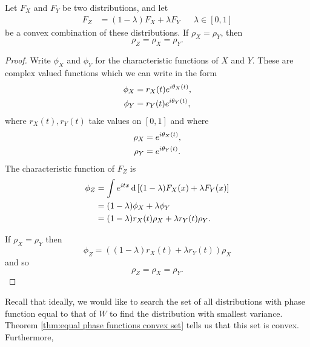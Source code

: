 	\begin{theorem}
	\label{thm:equal phase functions convex set}
		Let $F_X$ and $F_Y$ be two distributions, and let
		\begin{align}
			F_Z &= (1 - \lambda) F_X + \lambda F_Y && \lambda \in [0,1]
		\end{align}
		be a convex combination of these distributions. If $\rho_X = \rho_Y$, then 
		\begin{equation}
			\rho_Z = \rho_X = \rho_Y.
		\end{equation}
	\end{theorem}
	\begin{proof}
		Write $\phi_X$ and $\phi_Y$ for the characteristic functions of $X$ and $Y$. These are complex valued functions which we can write in the form
		\begin{align}
			\phi_X &= r_X(t) e^{i\theta_X(t)},\\
			\phi_Y &= r_Y(t) e^{i\theta_Y(t)},
		\end{align}
		where $r_X(t), r_Y(t)$ take values on $[0, 1]$ and where
		\begin{align}
			\rho_X &= e^{i\theta_X(t)},\\
			\rho_Y &= e^{i\theta_Y(t)}.
		\end{align}
		The characteristic function of $F_Z$ is 
		\begin{align}
			\phi_Z &= \int e^{itx} \, \mathrm{d} \left[(1 - \lambda)F_X(x) + \lambda F_Y(x)\right]\\
			&= (1 - \lambda)\phi_X + \lambda \phi_Y\\
			&= (1 - \lambda) r_X(t) \rho_X + \lambda r_Y(t) \rho_Y.
		\end{align}

		If $\rho_X = \rho_Y$ then
		\begin{equation}
			\phi_Z = \left((1 - \lambda)r_X(t) + \lambda r_Y(t)\right) \rho_X
		\end{equation}
		and so 
		\begin{equation}
			\rho_Z = \rho_X = \rho_Y.
		\end{equation}
	\end{proof}

Recall that ideally, we would like to search the set of all distributions with phase function equal to that of $W$ to find the distribution with smallest variance. Theorem \ref{thm:equal phase functions convex set} tells us that this set is convex. Furthermore, 

